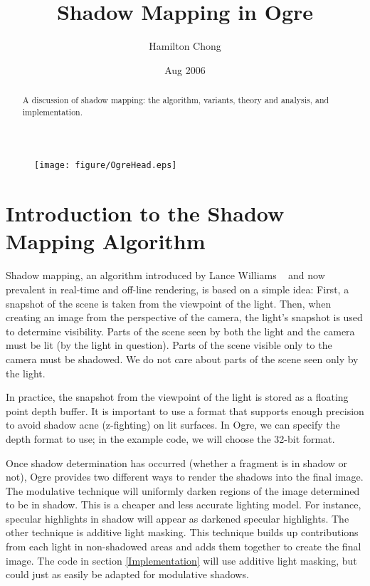 \documentclass[]{article}  %
\begin{document}
\begin{figure}
	\centering
		\texttt{[image: figure/OgreHead.eps]}
	\label{OgreHead}
\end{figure}


\title{Shadow Mapping in Ogre}   %
\author{\small Hamilton Chong}         %
\date{\small Aug 2006}    %
\maketitle

\newpage

\begin{abstract}
A discussion of shadow mapping: the algorithm, variants, theory and analysis, and implementation.
\end{abstract}

\section{Introduction to the Shadow Mapping Algorithm}            
\label{Introduction}


Shadow mapping, an algorithm introduced by Lance Williams ~\cite{WIL78} and now prevalent in real-time and off-line rendering, is based on a simple idea:  First, a snapshot of the scene is taken from the viewpoint of the light.  Then, when creating an image from the perspective of the camera, the light's snapshot is used to determine visibility.  Parts of the scene seen by both the light and the camera must be lit (by the light in question).  Parts of the scene visible only to the camera must be shadowed.  We do not care about parts of the scene seen only by the light.  

In practice, the snapshot from the viewpoint of the light is stored as a floating point depth buffer.  It is important to use a format that supports enough precision to avoid shadow acne (z-fighting) on lit surfaces.  In Ogre, we can specify the depth format to use; in the example code, we will choose the 32-bit format. 

Once shadow determination has occurred (whether a fragment is in shadow or not), Ogre provides two different ways to render the shadows into the final image.  The modulative technique will uniformly darken regions of the image determined to be in shadow.  This is a cheaper and less accurate lighting model.  For instance, specular highlights in shadow will appear as darkened specular highlights.  The other technique is additive light masking.  This technique builds up contributions from each light in non-shadowed areas and adds them together to create the final image.  The code in section \ref{Implementation} will use additive light masking, but could just as easily be adapted for modulative shadows.
\end{document}
